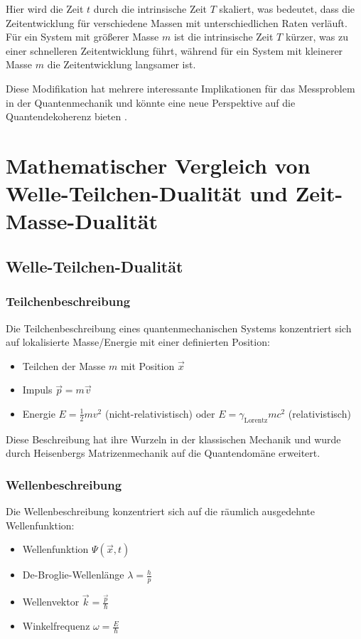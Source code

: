 \documentclass[a4paper,12pt]{article}
\newcommand{\vecx}{\vec{x}}
\newcommand{\gammaf}{\gamma_{\text{Lorentz}}}
\begin{document}
	Hier wird die Zeit $t$ durch die intrinsische Zeit $T$ skaliert, was bedeutet, dass die Zeitentwicklung für verschiedene Massen mit unterschiedlichen Raten verläuft. Für ein System mit größerer Masse $m$ ist die intrinsische Zeit $T$ kürzer, was zu einer schnelleren Zeitentwicklung führt, während für ein System mit kleinerer Masse $m$ die Zeitentwicklung langsamer ist.
	
	Diese Modifikation hat mehrere interessante Implikationen für das Messproblem in der Quantenmechanik \cite{Schlosshauer2005} und könnte eine neue Perspektive auf die Quantendekoherenz bieten \cite{Zurek2003}.
	
	\section{Mathematischer Vergleich von Welle-Teilchen-Dualität und Zeit-Masse-Dualität}
	
	\subsection{Welle-Teilchen-Dualität}
	
	\subsubsection{Teilchenbeschreibung}
	Die Teilchenbeschreibung eines quantenmechanischen Systems konzentriert sich auf lokalisierte Masse/Energie mit einer definierten Position:
	\begin{itemize}
		\item Teilchen der Masse $m$ mit Position $\vecx$
		\item Impuls $\vec{p} = m\vec{v}$
		\item Energie $E = \frac{1}{2}mv^2$ (nicht-relativistisch) oder $E = \gammaf mc^2$ (relativistisch)
	\end{itemize}
	
	Diese Beschreibung hat ihre Wurzeln in der klassischen Mechanik und wurde durch Heisenbergs Matrizenmechanik \cite{Heisenberg1925} auf die Quantendomäne erweitert.
	
	\subsubsection{Wellenbeschreibung}
	Die Wellenbeschreibung konzentriert sich auf die räumlich ausgedehnte Wellenfunktion:
	\begin{itemize}
		\item Wellenfunktion $\Psi(\vecx,t)$
		\item De-Broglie-Wellenlänge $\lambda = \frac{h}{p}$
		\item Wellenvektor $\vec{k} = \frac{\vec{p}}{\hbar}$
		\item Winkelfrequenz $\omega = \frac{E}{\hbar}$
	\end{itemize}
	
\end{document}
